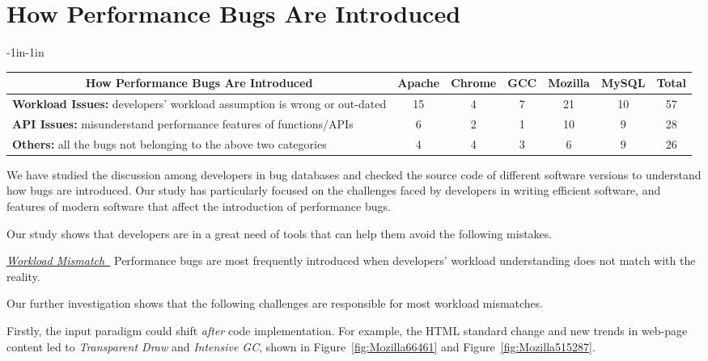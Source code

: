\section{How Performance Bugs Are Introduced}
\label{sec:3_introduce}

\begin{table*}[tb!]
\begin{adjustwidth}{-1in}{-1in}
\scriptsize
\centering
{
\begin{tabular}{lcccccc}
\toprule
\multicolumn{1}{c}{\bf How Performance Bugs Are Introduced} &Apache&Chrome&GCC&Mozilla&MySQL&Total\\
\midrule
\multicolumn{1}{l}{{\bf Workload Issues:} {developers' workload assumption is wrong or out-dated}}
&15&4&7&21&10&57\\
\midrule
\multicolumn{1}{l}{{\bf API Issues:} {misunderstand performance features of functions/APIs}}
&6&2&1&10&9&28\\
\midrule
\multicolumn{1}{l}{{\bf Others:} all the bugs not belonging to the above two categories}
&4&4&3&6&9&26\\
\bottomrule

\end{tabular}
}
\end{adjustwidth}
\caption{How performance bugs are introduced in Sections~\ref{sec:3_introduce}.}
\label{tab:3_intro}
\end{table*}

We have studied the discussion among developers in bug databases and checked the 
source code of different software versions to understand how bugs are introduced. 
Our study has particularly focused on the challenges faced by developers in writing 
efficient software, and features of modern software that affect the introduction
of performance bugs. 

Our study shows that developers are in a great need of tools that can help them 
avoid the following mistakes.

\underline{\it Workload Mismatch\ }
Performance bugs are most frequently introduced when 
developers' workload understanding does not match with the reality.

Our further investigation shows that the following challenges
are responsible for most workload mismatches.

Firstly, the input paradigm could shift {\it after}
code implementation. For example, the HTML standard change and new trends in 
web-page content led to {\it Transparent Draw} and
{\it Intensive GC}, shown
in Figure~\ref{fig:Mozilla66461} and Figure~\ref{fig:Mozilla515287}.

